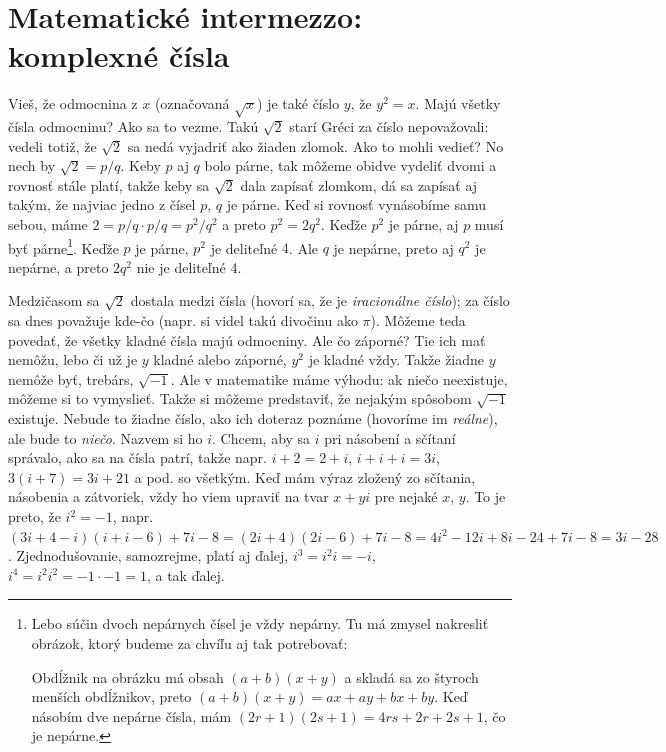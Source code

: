 \chapter{Matematické intermezzo: komplexné čísla}
\label{mat.komplex}

Vieš, že odmocnina z $x$ (označovaná $\sqrt{x}$) je také číslo $y$, že $y^2=x$. 
Majú všetky čísla odmocninu? Ako sa to vezme. Takú $\sqrt{2}$
starí Gréci za číslo nepovažovali: vedeli totiž, že $\sqrt{2}$ sa nedá vyjadriť ako
žiaden zlomok. Ako to mohli vedieť? No nech by $\sqrt{2}=p/q$. Keby $p$ aj 
$q$ bolo párne, tak môžeme obidve vydeliť dvomi a rovnosť stále platí, takže keby
sa $\sqrt{2}$ dala zapísať zlomkom, dá sa zapísať aj takým, že najviac jedno z čísel
$p$, $q$ je párne. Keď si rovnosť vynásobíme samu sebou, máme 
$2=p/q\cdot p/q=p^2/q^2$ a preto $p^2=2q^2$.
Keďže $p^2$ je párne, aj $p$ musí byť párne\footnote{%
Lebo súčin dvoch nepárnych čísel je vždy nepárny. Tu má zmysel nakresliť obrázok, ktorý
budeme za chvíľu aj tak potrebovať:

  \centerline{}
Obdĺžnik na obrázku má obsah $(a+b)(x+y)$ a skladá sa zo štyroch menších obdĺžnikov,
preto $(a+b)(x+y)=ax+ay+bx+by$. Keď násobím dve nepárne čísla, mám 
$(2r+1)(2s+1)=4rs+2r+2s+1$, čo je nepárne.
}. Keďže $p$ je párne, $p^2$ je deliteľné $4$. Ale $q$ je nepárne, preto aj $q^2$ je nepárne,
a preto $2q^2$ nie je deliteľné 4. 


Medzičasom sa $\sqrt{2}$ dostala medzi čísla (hovorí sa, že je {\em iracionálne číslo});
za číslo sa dnes považuje kde-čo (napr. si videl takú divočinu ako $\pi$). Môžeme
teda povedať, že všetky kladné čísla majú odmocniny. Ale čo záporné? Tie ich mať
nemôžu, lebo či už je $y$ kladné alebo záporné, $y^2$ je kladné vždy. Takže žiadne
$y$ nemôže byť, trebárs, $\sqrt{-1}$. Ale v matematike máme výhodu: ak niečo neexistuje,
môžeme si to vymyslieť. Takže si môžeme predstaviť, že nejakým spôsobom $\sqrt{-1}$ existuje.
Nebude to žiadne číslo, ako ich doteraz poznáme (hovoríme im {\em reálne}), ale bude to 
{\em niečo}. Nazvem si ho $i$. Chcem, aby sa $i$ pri násobení a sčítaní
správalo, ako sa na čísla patrí,
takže napr. $i+2=2+i$, $i+i+i=3i$, $3(i+7)=3i+21$ a pod. so všetkým. 
Keď mám výraz zložený zo sčítania, násobenia a zátvoriek, vždy ho viem upraviť na
tvar $x+yi$ pre nejaké $x$, $y$. To je preto, že $i^2=-1$, napr.
$(3i+4-i)(i+i-6)+7i-8=(2i+4)(2i-6)+7i-8=4i^2-12i+8i-24+7i-8=3i-28$.
Zjednodušovanie, samozrejme, platí aj ďalej, $i^3=i^2i=-i$, $i^4=i^2i^2=-1\cdot-1=1$, a 
tak ďalej.

